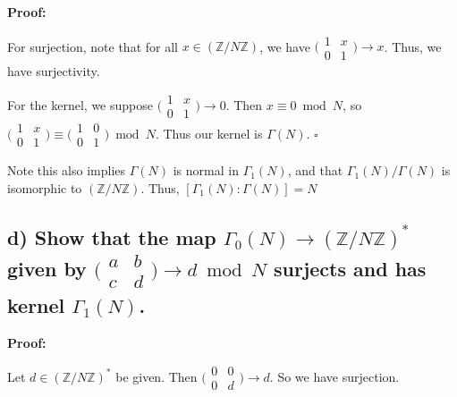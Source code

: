 \documentclass[11pt, oneside]{article}   	%
\begin{document}
\textbf{Proof:}

For surjection, note that for all $x \in (\mathbb{Z}/N\mathbb{Z})$, we have  $\bigl( \begin{smallmatrix}1 & x\\ 0 & 1\end{smallmatrix}\bigr)\rightarrow x$. Thus, we have surjectivity.

For the kernel, we suppose $\bigl( \begin{smallmatrix}1 & x\\ 0 & 1\end{smallmatrix}\bigr)\rightarrow 0$. Then $x\equiv 0 \bmod N$, so $\bigl( \begin{smallmatrix}1 & x\\ 0 & 1\end{smallmatrix}\bigr) \equiv \bigl( \begin{smallmatrix}1 & 0\\ 0 & 1\end{smallmatrix}\bigr) \bmod N$. Thus our kernel is $\Gamma (N)$. $\square$

Note this also implies $\Gamma (N)$ is normal in $\Gamma_1 (N)$, and that $\Gamma_1 (N)/\Gamma (N)$ is isomorphic to $(\mathbb{Z}/N\mathbb{Z})$. Thus, $[\Gamma_1 (N):\Gamma (N)]=N$

\subsection*{d) Show that the map $\Gamma_0 (N)\rightarrow (\mathbb{Z}/N\mathbb{Z})^*$ given by $\bigl( \begin{smallmatrix}a & b\\ c & d\end{smallmatrix}\bigr) \rightarrow d \bmod{N}$ surjects and has kernel $\Gamma_1 (N)$.}

\textbf{Proof:}

Let $d\in (\mathbb{Z}/N\mathbb{Z})^*$ be given. Then $\bigl( \begin{smallmatrix}0 & 0\\ 0 & d\end{smallmatrix}\bigr)\rightarrow d$. So we have surjection.
\end{document}
